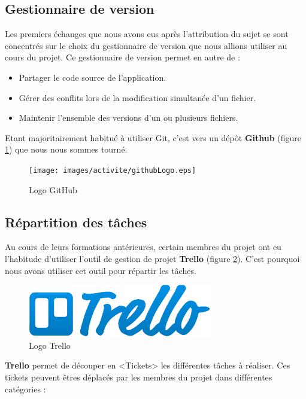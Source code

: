 \subsection{Gestionnaire de version}
Les premiers échanges que nous avons eus après l'attribution du sujet se sont concentrés sur le choix du gestionnaire de version que nous allions utiliser au cours du projet. Ce gestionnaire de version permet en autre de :
\begin{itemize}
\item Partager le code source de l'application.
\item Gérer des conflits lors de la modification simultanée d'un fichier.
\item Maintenir l'ensemble des versions d'un ou plusieurs fichiers.\\
\end{itemize}

Etant majoritairement habitué à utiliser Git, c'est vers un dép\^ot \textbf{Github} (figure \ref{github_logo}) que nous nous sommes tourné.

\begin{figure}[H]
\centering
\texttt{[image: images/activite/githubLogo.eps]}
\caption{Logo GitHub}
\label{github_logo}
\end{figure}



\subsection{Répartition des tâches}
Au cours de leurs formations antérieures, certain membres du projet ont eu l'habitude d'utiliser l'outil de gestion de projet \textbf{Trello} (figure \ref{trello_logo}). C'est pourquoi nous avons utiliser cet outil pour répartir les tâches.\\

\begin{figure}[H]
\centering
\includegraphics[width=8cm]{images/activite/trelloLogo.eps}
\caption{Logo Trello}
\label{trello_logo}
\end{figure}

\textbf{Trello} permet de découper en <Tickets> les différentes t\^aches à réaliser. Ces tickets peuvent \^etres déplacés par les membres du projet dans différentes catégories :

